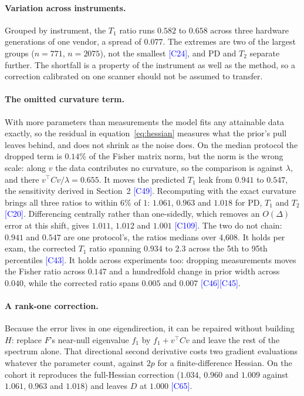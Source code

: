 \documentclass{article}
\newcommand{\claim}[1]{\textcolor{blue}{\footnotesize[#1]}}
\newcommand{\claim}[1]{\unskip}
\begin{document}
\paragraph{Variation across instruments.} Grouped by instrument, the $T_1$
ratio runs $0.582$ to $0.658$ across three hardware generations of one vendor, a spread of
$0.077$. The extremes are two of the largest groups ($n=771$, $n=2075$), not the smallest
\claim{C24}, and PD and $T_2$ separate further. The shortfall is a property of the instrument as
well as the method, so a correction calibrated on one scanner should not be assumed to transfer.

\paragraph{The omitted curvature term.} With more parameters than
measurements the model fits any attainable data exactly, so the residual in
equation~\ref{eq:hessian} measures what the prior's pull leaves behind, and does not
shrink as the noise does. On the median protocol the dropped term is $0.14\%$ of the Fisher matrix norm, but the norm is
the wrong scale: along $v$ the data contributes no curvature, so the comparison is against
$\lambda$, and there $v^\top C v / \lambda = 0.655$. It moves the predicted $T_1$ leak from $0.941$
to $0.547$, the sensitivity derived in Section~2 \claim{C49}. Recomputing with the exact curvature brings all three ratios to within
$6\%$ of $1$: $1.061$, $0.963$ and $1.018$ for PD, $T_1$ and $T_2$ \claim{C20}. Differencing centrally rather than one-sidedly, which removes an
$O(\Delta)$ error at this shift, gives $1.011$, $1.012$ and $1.001$ \claim{C109}. The two do not chain: $0.941$ and $0.547$ are one protocol's,
the ratios medians over 4{,}608. It holds per exam,
the corrected $T_1$ ratio spanning $0.934$ to $2.3$ across the 5th to 95th percentiles
\claim{C43}. It holds across experiments too: dropping measurements moves the Fisher ratio across $0.147$
and a hundredfold change in prior width across $0.040$, while the corrected ratio spans $0.005$
and $0.007$ \claim{C46}\claim{C45}.

\paragraph{A rank-one correction.} Because the error lives in one
eigendirection, it can be repaired without building $H$: replace $F$'s near-null eigenvalue $f_1$
by $f_1 + v^\top C v$ and leave the rest of the spectrum alone. That directional second derivative
costs two gradient evaluations whatever the parameter count, against $2p$ for a finite-difference
Hessian. On the cohort it reproduces the full-Hessian correction ($1.034$,
$0.960$ and $1.009$ against $1.061$, $0.963$ and $1.018$) and leaves $D$ at $1.000$
\claim{C65}.
\end{document}
